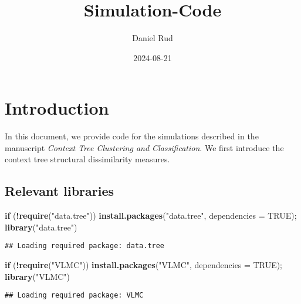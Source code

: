 \documentclass[
]{article}
\title{Simulation-Code}
\author{Daniel Rud}
\date{2024-08-21}
\newenvironment{Shaded}{\begin{snugshade}}{\end{snugshade}}
\newcommand{\AttributeTok}[1]{\textcolor[rgb]{0.13,0.29,0.53}{#1}}
\newcommand{\ConstantTok}[1]{\textcolor[rgb]{0.56,0.35,0.01}{#1}}
\newcommand{\ControlFlowTok}[1]{\textcolor[rgb]{0.13,0.29,0.53}{\textbf{#1}}}
\newcommand{\FunctionTok}[1]{\textcolor[rgb]{0.13,0.29,0.53}{\textbf{#1}}}
\newcommand{\NormalTok}[1]{#1}
\newcommand{\SpecialCharTok}[1]{\textcolor[rgb]{0.81,0.36,0.00}{\textbf{#1}}}
\newcommand{\StringTok}[1]{\textcolor[rgb]{0.31,0.60,0.02}{#1}}
\begin{document}
\maketitle

\section{Introduction}\label{introduction}

In this document, we provide code for the simulations described in the
manuscript \emph{Context Tree Clustering and Classification}. We first
introduce the context tree structural dissimilarity measures.

\subsection{Relevant libraries}\label{relevant-libraries}

\begin{Shaded}
\begin{Highlighting}[]
\ControlFlowTok{if}\NormalTok{ (}\SpecialCharTok{!}\FunctionTok{require}\NormalTok{(}\StringTok{"data.tree"}\NormalTok{)) }\FunctionTok{install.packages}\NormalTok{(}\StringTok{"data.tree"}\NormalTok{, }\AttributeTok{dependencies =} \ConstantTok{TRUE}\NormalTok{); }\FunctionTok{library}\NormalTok{(}\StringTok{"data.tree"}\NormalTok{)}
\end{Highlighting}
\end{Shaded}

\begin{verbatim}
## Loading required package: data.tree
\end{verbatim}

\begin{Shaded}
\begin{Highlighting}[]
\ControlFlowTok{if}\NormalTok{ (}\SpecialCharTok{!}\FunctionTok{require}\NormalTok{(}\StringTok{"VLMC"}\NormalTok{)) }\FunctionTok{install.packages}\NormalTok{(}\StringTok{"VLMC"}\NormalTok{, }\AttributeTok{dependencies =} \ConstantTok{TRUE}\NormalTok{); }\FunctionTok{library}\NormalTok{(}\StringTok{"VLMC"}\NormalTok{)}
\end{Highlighting}
\end{Shaded}

\begin{verbatim}
## Loading required package: VLMC
\end{verbatim}
\end{document}
